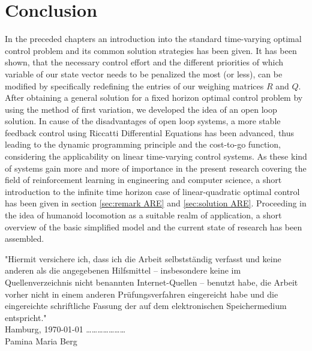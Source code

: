 \documentclass[paper=a4, pagesize, DIV=calc, BCOR=12.5mm, twoside=on, onecolumn=on, open = any, titlepage =on, parskip =half-, headsepline = on, footsepline = on, chapterprefix = on, appendixprefix = off, fontsize = 12pt, numbers = noenddot, abstract = on]{scrbook}
\numberwithin{equation}{chapter}
\theoremstyle{definition}
\theoremstyle{plain}
\theoremstyle{plain}
\theoremstyle{remark}
\theoremstyle{plain}
\theoremstyle{plain}
\begin{document}
\newpage
\chapter{Conclusion}
In the preceded chapters an introduction into the standard time-varying optimal control problem and its common solution strategies has been given. It has been shown, that the necessary control effort and the different priorities of which variable of our state vector needs to be penalized the most (or less), can be modified by specifically redefining the entries of our weighing matrices $R$ and $Q$. After obtaining a general solution for a fixed horizon optimal control problem by using the method of first variation, we developed the idea of an open loop solution. In cause of the disadvantages of open loop systems, a more stable feedback control using Riccatti Differential Equations has been advanced, thus leading to the dynamic programming principle and the cost-to-go function, considering the applicability on linear time-varying control systems. As these kind of systems gain more and more of importance in the present research covering the field of reinforcement learning in engineering and computer science, a short introduction to the infinite time horizon case of linear-quadratic optimal control has been given in section \ref{sec:remark ARE} and \ref{sec:solution ARE}. Proceeding in the idea of humanoid locomotion as a suitable realm of application, a short overview of the basic simplified model and the current state of research has been assembled.  %

\newpage

\newpage
\thispagestyle{empty}
\vspace*{\fill}
"Hiermit versichere ich, dass ich die Arbeit selbstständig verfasst und keine anderen als die angegebenen Hilfsmittel – insbesondere keine im Quellenverzeichnis nicht benannten Internet-Quellen – benutzt habe, die Arbeit vorher nicht in einem anderen Prüfungsverfahren eingereicht habe und die eingereichte schriftliche Fassung der auf dem elektronischen Speichermedium entspricht."\\

Hamburg, \today \hspace*{\fill} \dots \dots \dots \dots \dots \dots \dots\\
\hspace*{\fill} Pamina Maria Berg $\,$
\end{document}
